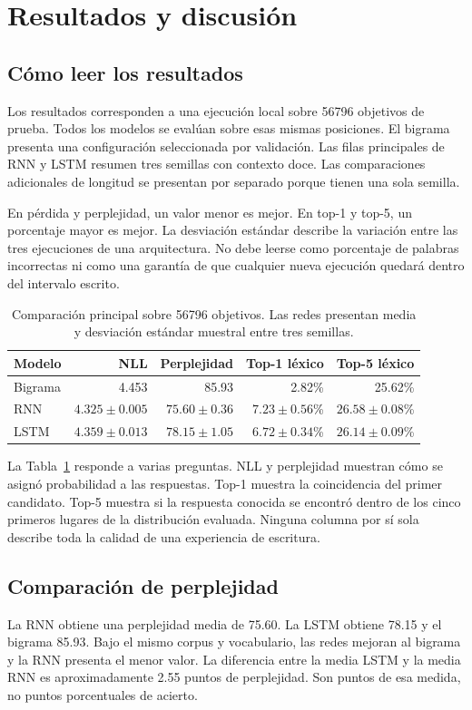\section{Resultados y discusión}
\subsection{Cómo leer los resultados}
Los resultados corresponden a una ejecución local sobre 56796 objetivos de prueba. Todos los modelos se evalúan sobre esas mismas posiciones. El bigrama presenta una configuración seleccionada por validación. Las filas principales de RNN y LSTM resumen tres semillas con contexto doce. Las comparaciones adicionales de longitud se presentan por separado porque tienen una sola semilla.

En pérdida y perplejidad, un valor menor es mejor. En top-1 y top-5, un porcentaje mayor es mejor. La desviación estándar describe la variación entre las tres ejecuciones de una arquitectura. No debe leerse como porcentaje de palabras incorrectas ni como una garantía de que cualquier nueva ejecución quedará dentro del intervalo escrito.

\begin{table}[tb]
\caption{Comparación principal sobre 56796 objetivos. Las redes presentan media y desviación estándar muestral entre tres semillas.}
\label{tab:principal}
\centering
\begin{tabular}{lrrrr}
\toprule Modelo & NLL & Perplejidad & Top-1 léxico & Top-5 léxico\\\midrule
Bigrama & 4.453 & 85.93 & 2.82\% & 25.62\%\\
RNN & $4.325\pm0.005$ & $75.60\pm0.36$ & $7.23\pm0.56$\% & $26.58\pm0.08$\%\\
LSTM & $4.359\pm0.013$ & $78.15\pm1.05$ & $6.72\pm0.34$\% & $26.14\pm0.09$\%\\\bottomrule
\end{tabular}
\end{table}

La Tabla~\ref{tab:principal} responde a varias preguntas. NLL y perplejidad muestran cómo se asignó probabilidad a las respuestas. Top-1 muestra la coincidencia del primer candidato. Top-5 muestra si la respuesta conocida se encontró dentro de los cinco primeros lugares de la distribución evaluada. Ninguna columna por sí sola describe toda la calidad de una experiencia de escritura.

\subsection{Comparación de perplejidad}
La RNN obtiene una perplejidad media de 75.60. La LSTM obtiene 78.15 y el bigrama 85.93. Bajo el mismo corpus y vocabulario, las redes mejoran al bigrama y la RNN presenta el menor valor. La diferencia entre la media LSTM y la media RNN es aproximadamente 2.55 puntos de perplejidad. Son puntos de esa medida, no puntos porcentuales de acierto.

